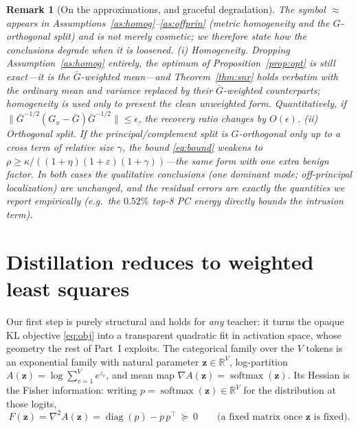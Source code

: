 \documentclass[11pt]{article}
\newtheorem{remark}{Remark}[section]
\DeclareMathOperator{\softmax}{softmax}
\DeclareMathOperator{\diag}{diag}
\newcommand{\R}{\mathbb{R}}
\newcommand{\bz}{\mathbf{z}}
\begin{document}
\begin{remark}[On the approximations, and graceful degradation]\label{rem:approx}
The symbol $\approx$ appears in Assumptions~\ref{as:homog}--\ref{as:offprin} (metric homogeneity and
the $G$-orthogonal split) and is not merely cosmetic; we therefore state how the conclusions degrade
when it is loosened. \emph{(i) Homogeneity.} Dropping Assumption~\ref{as:homog} entirely, the
optimum of Proposition~\ref{prop:opt} is still exact---it is the $\bar G$-weighted mean---and
Theorem~\ref{thm:snr} holds verbatim with the ordinary mean and variance replaced by their
$\bar G$-weighted counterparts; homogeneity is used \emph{only} to present the clean unweighted form.
Quantitatively, if $\|\bar G^{-1/2}(G_x-\bar G)\bar G^{-1/2}\|\le\epsilon$, the recovery ratio
changes by $O(\epsilon)$. \emph{(ii) Orthogonal split.} If the principal/complement split is
$G$-orthogonal only up to a cross term of relative size $\gamma$, the bound
\eqref{eq:bound} weakens to $\rho\ge\kappa/((1+\eta)(1+\varepsilon)(1+\gamma))$---the same form with
one extra benign factor. In both cases the \emph{qualitative} conclusions (one dominant mode;
off-principal localization) are unchanged, and the residual errors are exactly the quantities we
report empirically (e.g.\ the $0.52\%$ top-8 PC energy directly bounds the intrusion term).
\end{remark}

\section{Distillation reduces to weighted least squares}\label{sec:reduction}
Our first step is purely structural and holds for \emph{any} teacher: it turns the opaque KL
objective \eqref{eq:obj} into a transparent quadratic fit in activation space, whose geometry the
rest of Part~I exploits. The categorical family over the $V$ tokens is an exponential family with
natural parameter $\bz\in\R^V$, log-partition $A(\bz)=\log\sum_{v=1}^{V} e^{z_v}$, and mean map
$\nabla A(\bz)=\softmax(\bz)$. Its Hessian is the Fisher information: writing
$p=\softmax(\bz)\in\R^V$ for the distribution at those logits,
\begin{equation}\label{eq:fisher}
F(\bz)=\nabla^2 A(\bz)=\diag(p)-p\,p^\top\ \succeq\ 0
\qquad\text{(a fixed matrix once $\bz$ is fixed).}
\end{equation}
\end{document}
